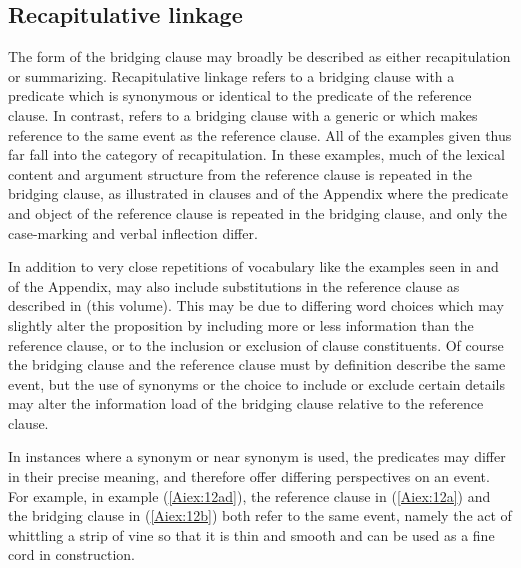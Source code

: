 \documentclass[output=paper]{LSP/langsci}
\begin{document}
\subsection{Recapitulative linkage} 
\label{AiRecapitulative}
The form of the bridging clause may broadly be described as either recapitulation or summarizing. Recapitulative linkage refers to a bridging clause with a predicate which is synonymous or identical to the predicate of the reference clause. In contrast,  refers to a bridging clause with a generic or  which makes reference to the same event as the reference clause. All of the examples given thus far fall into the category of recapitulation. In these examples, much of the lexical content and argument structure from the reference clause is repeated in the bridging clause, as illustrated in clauses  and  of the Appendix where the predicate and object of the reference clause is repeated in the bridging clause, and only the case-marking and verbal inflection differ.

In addition to very close repetitions of vocabulary like the examples seen in  and  of the Appendix,  may also include substitutions in the reference clause as described in \citeauthor{guerin18} (this volume). This may be due to differing word choices which may slightly alter the proposition by including more or less information than the reference clause, or to the inclusion or exclusion of clause constituents. Of course the bridging clause and the reference clause must by definition describe the same event, but the use of synonyms or the choice to include or exclude certain details may alter the information load of the bridging clause relative to the reference clause.

In instances where a synonym or near synonym is used, the predicates may differ in their precise meaning, and therefore offer differing perspectives on an event. For example, in example (\ref{Aiex:12ad}), the reference clause in (\ref{Aiex:12a}) and the bridging clause in (\ref{Aiex:12b}) both refer to the same event, namely the act of whittling a strip of vine so that it is thin and smooth and can be used as a fine cord in construction.
\end{document}
